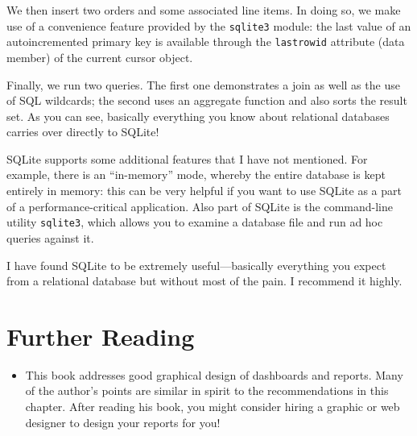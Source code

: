 We then insert two orders and some associated line items. In doing so,
we make use of a convenience feature provided by the \texttt{sqlite3}
module: the last value of an autoincremented primary key is available
through the \texttt{lastrowid} attribute (data member) of the current
cursor object. 

Finally, we run two queries. The first one demonstrates a join as well
as the use of SQL wildcards; the second uses an aggregate function and
also sorts the result set. As you can see, basically everything you
know about relational databases carries over directly to SQLite! 

SQLite supports some additional features that I have not mentioned.
For example, there is an ``in-memory'' mode, whereby the entire
database is kept entirely in memory: this can be very helpful if you
want to use SQLite as a part of a performance-critical application.
Also part of SQLite is the command-line utility \texttt{sqlite3},
which allows you to examine a database file and run ad hoc queries
against it.

I have found SQLite to be extremely useful---basically everything you
expect from a relational database but without most of the pain. I
recommend it highly.


\section{Further Reading}

\begin{itemize}
\item {}

  This book addresses good graphical design of dashboards and
  reports.  Many of the author's points are similar in spirit to the
  recommendations in this chapter.  After reading his book, you might
  consider hiring a graphic or web designer to design your reports
  for you!
\end{itemize}


\clearpage

\thispagestyle{empty}

\cleardoublepage
